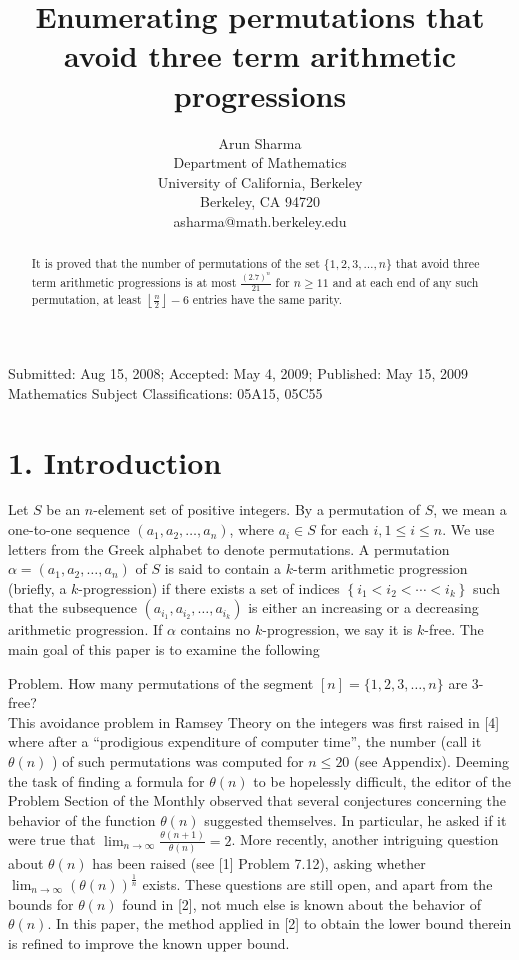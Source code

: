 \documentclass[10pt]{article}
\title{Enumerating permutations that avoid three term arithmetic progressions}
\author{Arun Sharma\\
Department of Mathematics\\
University of California, Berkeley\\
Berkeley, CA 94720\\
asharma@math.berkeley.edu}
\date{}
\begin{document}
\maketitle
Submitted: Aug 15, 2008; Accepted: May 4, 2009; Published: May 15, 2009\\
Mathematics Subject Classifications: 05A15, 05C55

\begin{abstract}
It is proved that the number of permutations of the set $\{1,2,3, \ldots, n\}$ that avoid three term arithmetic progressions is at most $\frac{(2.7)^{n}}{21}$ for $n \geq 11$ and at each end of any such permutation, at least $\left\lfloor\frac{n}{2}\right\rfloor-6$ entries have the same parity.
\end{abstract}

\section*{1. Introduction}
Let $S$ be an $n$-element set of positive integers. By a permutation of $S$, we mean a one-to-one sequence $\left(a_{1}, a_{2}, \ldots, a_{n}\right)$, where $a_{i} \in S$ for each $i, 1 \leq i \leq n$. We use letters from the Greek alphabet to denote permutations. A permutation $\alpha=\left(a_{1}, a_{2}, \ldots, a_{n}\right)$ of $S$ is said to contain a $k$-term arithmetic progression (briefly, a $k$-progression) if there exists a set of indices $\left\{i_{1}<i_{2}<\cdots<i_{k}\right\}$ such that the subsequence $\left(a_{i_{1}}, a_{i_{2}}, \ldots, a_{i_{k}}\right)$ is either an increasing or a decreasing arithmetic progression. If $\alpha$ contains no $k$-progression, we say it is $k$-free. The main goal of this paper is to examine the following

Problem. How many permutations of the segment $[n]=\{1,2,3, \ldots, n\}$ are 3-free?\\[0pt]
This avoidance problem in Ramsey Theory on the integers was first raised in [4] where after a ``prodigious expenditure of computer time'', the number (call it $\theta(n)$ ) of such permutations was computed for $n \leq 20$ (see Appendix). Deeming the task of finding a formula for $\theta(n)$ to be hopelessly difficult, the editor of the Problem Section of the Monthly observed that several conjectures concerning the behavior of the function $\theta(n)$ suggested themselves. In particular, he asked if it were true that $\lim _{n \rightarrow \infty} \frac{\theta(n+1)}{\theta(n)}=2$. More recently, another intriguing question about $\theta(n)$ has been raised (see [1] Problem 7.12), asking whether $\lim _{n \rightarrow \infty}(\theta(n))^{\frac{1}{n}}$ exists. These questions are still open, and apart from the bounds for $\theta(n)$ found in [2], not much else is known about the behavior of $\theta(n)$. In this paper, the method applied in [2] to obtain the lower bound therein is refined to improve the known upper bound.
\end{document}
